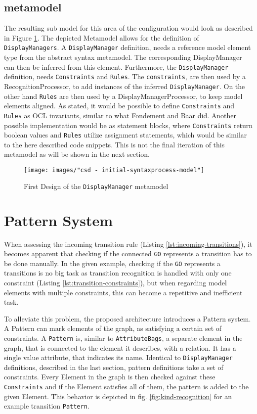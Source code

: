 \subsection{metamodel}
The resulting sub model for this area of the configuration would look as described in Figure \ref{fig:initial-syntax-model}. The depicted Metamodel allows for the definition of \texttt{DisplayManagers}. A \texttt{DisplayManager} definition, needs a reference model element type from the abstract syntax metamodel. The corresponding DisplayManager can then be inferred from this element. Furthermore, the \texttt{DisplayManager} definition, needs \texttt{Constraints} and \texttt{Rules}. The \texttt{constraints}, are then used by a RecognitionProcessor, to add instances of the inferred \texttt{DisplayManager}. On the other hand \texttt{Rules} are then used by a DisplayManagerProcessor, to keep model elements aligned. As stated, it would be possible to define \texttt{Constraints} and \texttt{Rules} as OCL invariants, similar to what Fondement and Baar did. Another possible implementation would be as statement blocks, where \texttt{Constraints} return boolean values and \texttt{Rules} utilize assignment statements, which would be similar to the here described code snippets. This is not the final iteration of this metamodel as will be shown in the next section.

\begin{figure}
  \centering
  \texttt{[image: images/"csd - initial-syntaxprocess-model"]}
  \caption{First Design of the \texttt{DisplayManager} metamodel}
  \label{fig:initial-syntax-model}
\end{figure}


\section{Pattern System}
When assessing the incoming transition rule (Listing \ref{lst:incoming-transitions}), it becomes apparent that checking if the connected \texttt{GO} represents a transition has to be done manually. In the given example, checking if the \texttt{GO} represents a transitions is no big task as transition recognition is handled with only one constraint (Listing \ref{lst:transition-constraints}), but when regarding model elements with multiple constraints, this can become a repetitive and inefficient task.

To alleviate this problem, the proposed architecture introduces a Pattern system. A Pattern can mark elements of the graph, as satisfying a certain set of constraints. A \texttt{Pattern} is, similar to \texttt{AttributeBags}, a separate element in the graph, that is connected to the element it describes, with a relation. It has a single value attribute, that indicates its name. Identical to \texttt{DisplayManager} definitions, described in the last section, pattern definitions take a set of constraints. Every Element in the graph is then checked against these \texttt{Constraints} and if the Element satisfies all of them, the pattern is added to the given Element. This behavior is depicted in fig. \ref{fig:kind-recognition} for an example transition \texttt{Pattern}.

